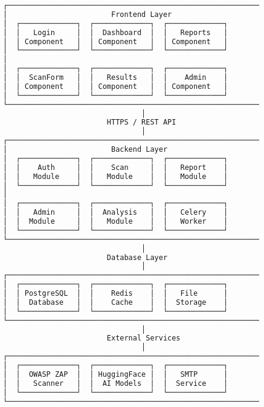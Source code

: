 \documentclass[main.tex]{subfiles}
\begin{document}
\begin{figure}[h]
\centering
\begin{lstlisting}[language=bash, caption=WebSecPen системийн бүрэн архитектур]
┌─────────────────────────────────────────────────────────────────┐
│                        Frontend Layer                           │
│  ┌─────────────┐  ┌─────────────┐  ┌─────────────┐              │
│  │   Login     │  │  Dashboard  │  │   Reports   │              │
│  │ Component   │  │ Component   │  │ Component   │              │
│  └─────────────┘  └─────────────┘  └─────────────┘              │
│                                                                 │
│  ┌─────────────┐  ┌─────────────┐  ┌─────────────┐              │
│  │  ScanForm   │  │   Results   │  │    Admin    │              │
│  │ Component   │  │ Component   │  │ Component   │              │
│  └─────────────┘  └─────────────┘  └─────────────┘              │
└─────────────────────────────────────────────────────────────────┘
                                │
                        HTTPS / REST API
                                │
┌─────────────────────────────────────────────────────────────────┐
│                        Backend Layer                            │
│  ┌─────────────┐  ┌─────────────┐  ┌─────────────┐              │
│  │    Auth     │  │    Scan     │  │   Report    │              │
│  │   Module    │  │   Module    │  │   Module    │              │
│  └─────────────┘  └─────────────┘  └─────────────┘              │
│                                                                 │
│  ┌─────────────┐  ┌─────────────┐  ┌─────────────┐              │
│  │   Admin     │  │  Analysis   │  │   Celery    │              │
│  │  Module     │  │   Module    │  │   Worker    │              │
│  └─────────────┘  └─────────────┘  └─────────────┘              │
└─────────────────────────────────────────────────────────────────┘
                                │
                        Database Layer
                                │
┌─────────────────────────────────────────────────────────────────┐
│  ┌─────────────┐  ┌─────────────┐  ┌─────────────┐              │
│  │ PostgreSQL  │  │    Redis    │  │   File      │              │
│  │  Database   │  │    Cache    │  │  Storage    │              │
│  └─────────────┘  └─────────────┘  └─────────────┘              │
└─────────────────────────────────────────────────────────────────┘
                                │
                        External Services
                                │
┌─────────────────────────────────────────────────────────────────┐
│  ┌─────────────┐  ┌─────────────┐  ┌─────────────┐              │
│  │  OWASP ZAP  │  │ HuggingFace │  │   SMTP      │              │
│  │   Scanner   │  │  AI Models  │  │  Service    │              │
│  └─────────────┘  └─────────────┘  └─────────────┘              │
└─────────────────────────────────────────────────────────────────┘
\end{lstlisting}
\end{figure}
\end{document}
